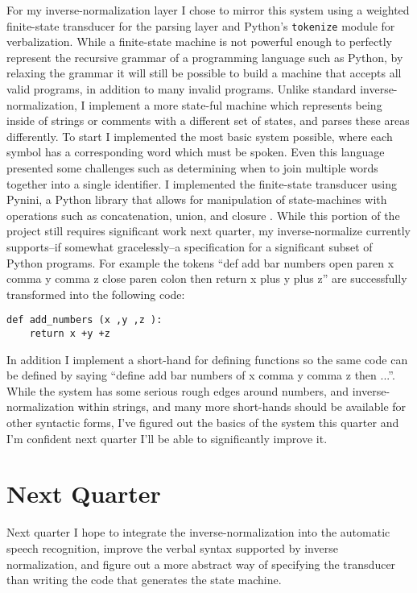 \documentclass{article}
\begin{document}
For my inverse-normalization layer I chose to mirror this system using a weighted finite-state transducer for the parsing layer and Python's \texttt{tokenize} module for verbalization. While a finite-state machine is not powerful enough to perfectly represent the recursive grammar of a programming language such as Python, by relaxing the grammar it will still be possible to build a machine that accepts all valid programs, in addition to many invalid programs. Unlike standard inverse-normalization, I implement a more state-ful machine which represents being inside of strings or comments with a different set of states, and parses these areas differently. To start I implemented the most basic system possible, where each symbol has a corresponding word which must be spoken. Even this language presented some challenges such as determining when to join multiple words together into a single identifier. I implemented the finite-state transducer using Pynini, a Python library that allows for manipulation of state-machines with operations such as concatenation, union, and closure \cite{pynini}. While this portion of the project still requires significant work next quarter, my inverse-normalize currently supports--if somewhat gracelessly--a specification for a significant subset of Python programs. For example the tokens ``def add bar numbers open paren x comma y comma z close paren colon then return x plus y plus z'' are successfully transformed into the following code:

\begin{lstlisting}
def add_numbers (x ,y ,z ):
	return x +y +z
\end{lstlisting}

In addition I implement a short-hand for defining functions so the same code can be defined by saying ``define add bar numbers of x comma y comma z then ...''. While the system has some serious rough edges around numbers, and inverse-normalization within strings, and many more short-hands should be available for other syntactic forms, I've figured out the basics of the system this quarter and I'm confident next quarter I'll be able to significantly improve it.

\section{Next Quarter}

Next quarter I hope to integrate the inverse-normalization into the automatic speech recognition, improve the verbal syntax supported by inverse normalization, and figure out a more abstract way of specifying the transducer than writing the code that generates the state machine.
\end{document}
